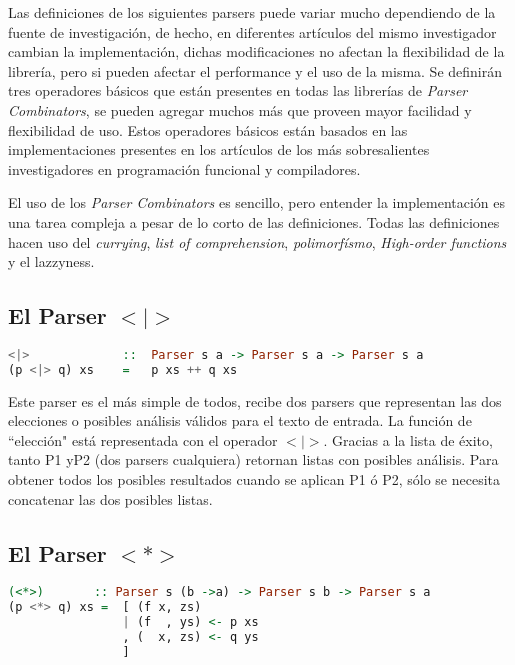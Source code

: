 Las definiciones de los siguientes parsers puede variar mucho dependiendo de la fuente de investigación, de hecho, en diferentes artículos del mismo investigador cambian la implementación, dichas modificaciones no afectan la flexibilidad de la librería, pero si pueden afectar el performance y el uso de la misma. Se definirán tres operadores básicos que están presentes en todas las librerías de \emph{Parser Combinators}, se pueden agregar muchos más que proveen mayor facilidad y flexibilidad de uso. Estos operadores básicos están basados en las implementaciones presentes en los artículos de los más sobresalientes investigadores en programación funcional y compiladores.

El uso de los \emph{Parser Combinators} es sencillo, pero entender la implementación es una tarea compleja a pesar de lo corto de las definiciones. Todas las definiciones hacen uso del \emph{currying}, \emph{list of comprehension}, \emph{polimorfísmo}, \emph{High-order functions} y el lazzyness.

\subsection{El Parser $<|>$}

\begin{lstlisting}[language=Haskell, caption=definición del parser de elección]
<|>				::	Parser s a -> Parser s a -> Parser s a
(p <|> q) xs	=	p xs ++ q xs
\end{lstlisting}

Este parser es el más simple de todos, recibe dos parsers que representan las dos elecciones o posibles análisis válidos para el texto de entrada. La función de ``elección" está representada con el operador $<|>$. Gracias a la lista de éxito, tanto \textsc{P1} y\textsc{P2} (dos parsers cualquiera) retornan listas con posibles análisis. Para obtener todos los posibles resultados cuando se aplican \textsc{P1} ó \textsc{P2}, sólo se necesita concatenar las dos posibles listas.\cite{Jeuring2010}

\subsection{El Parser $<*>$}

\begin{lstlisting}[language=Haskell, caption=definición del parser de sequencia]
(<*>)		:: Parser s (b ->a) -> Parser s b -> Parser s a
(p <*> q) xs =	[ (f x, zs)
				| (f  , ys) <- p xs
				, (  x, zs) <- q ys
				]
\end{lstlisting}

